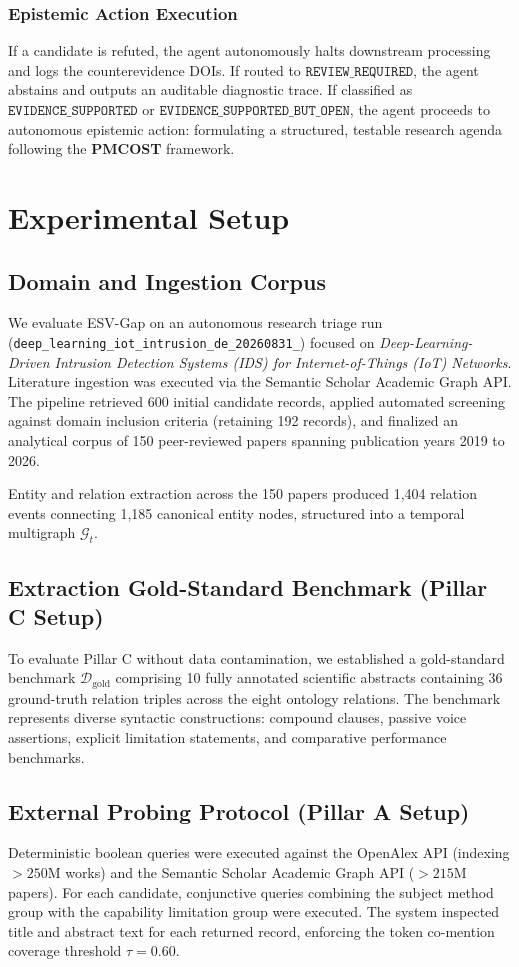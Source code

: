 \documentclass[conference,10pt]{IEEEtran}
\newcommand{\method}{ESV-Gap}
\newcommand{\runid}{\texttt{deep\_learning\_\allowbreak iot\_intrusion\_\allowbreak de\_20260831\_\allowbreak 114802}}
\begin{document}
\subsubsection*{Epistemic Action Execution}
If a candidate is refuted, the agent autonomously halts downstream processing and logs the counterevidence DOIs. If routed to $\texttt{REVIEW\_REQUIRED}$, the agent abstains and outputs an auditable diagnostic trace. If classified as $\texttt{EVIDENCE\_SUPPORTED}$ or $\texttt{EVIDENCE\_SUPPORTED\_BUT\_OPEN}$, the agent proceeds to autonomous epistemic action: formulating a structured, testable research agenda following the \textbf{PMCOST} framework.

\section{Experimental Setup}

\subsection{Domain and Ingestion Corpus}
We evaluate \method{} on an autonomous research triage run (\runid{}) focused on \emph{Deep-Learning-Driven Intrusion Detection Systems (IDS) for Internet-of-Things (IoT) Networks}. Literature ingestion was executed via the Semantic Scholar Academic Graph API. The pipeline retrieved 600 initial candidate records, applied automated screening against domain inclusion criteria (retaining 192 records), and finalized an analytical corpus of 150 peer-reviewed papers spanning publication years 2019 to 2026.

Entity and relation extraction across the 150 papers produced 1,404 relation events connecting 1,185 canonical entity nodes, structured into a temporal multigraph $\mathcal{G}_t$.

\subsection{Extraction Gold-Standard Benchmark (Pillar C Setup)}
To evaluate Pillar C without data contamination, we established a gold-standard benchmark $\mathcal{D}_{\text{gold}}$ comprising 10 fully annotated scientific abstracts containing 36 ground-truth relation triples across the eight ontology relations. The benchmark represents diverse syntactic constructions: compound clauses, passive voice assertions, explicit limitation statements, and comparative performance benchmarks.

\subsection{External Probing Protocol (Pillar A Setup)}
Deterministic boolean queries were executed against the OpenAlex API (indexing $>250\text{M}$ works) and the Semantic Scholar Academic Graph API ($>215\text{M}$ papers). For each candidate, conjunctive queries combining the subject method group with the capability limitation group were executed. The system inspected title and abstract text for each returned record, enforcing the token co-mention coverage threshold $\tau = 0.60$.
\end{document}
